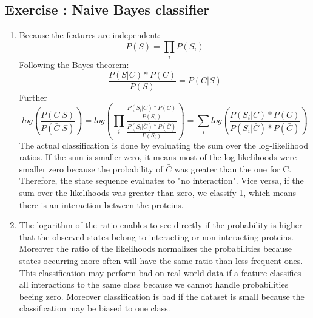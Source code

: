 \documentclass[10pt,a4paper]{article}
\newcommand{\exercise}[1]
{
  \stepcounter{subsection}
  \subsection*{Exercise \thesubsection: #1}

}
\begin{document}
\exercise{Naive Bayes classifier}
\begin{enumerate}
\item Because the features are independent: \begin{equation}P(S) = \prod_{i} P(S_i) \end{equation}
Following the Bayes theorem: \begin{equation} \frac{P(S|C) * P(C)} {P(S)} = P(C|S) \end{equation}
Further \begin{equation} log( \frac{P(C|S)} {P(\bar{C}|S)} ) = log( \prod_{i} \frac{ \frac{P(S_i|C) * P(C)}{P(S_i)} }{ \frac{P(S_i|\bar{C}) * P(\bar{C})}{P(S_i)} } ) = \sum_{i} log( \frac{P(S_i|C) * P(C)}{P(S_i|\bar{C}) * P(\bar{C})} ) \end{equation}
The actual classification is done by evaluating the sum over the log-likelihood ratios. If the sum is smaller zero, it means most of the log-likelihoods were smaller zero because the probability of $\bar{C}$ was greater than the one for C. Therefore, the state sequence evaluates to "no interaction". Vice versa, if the sum over the likelihoods was greater than zero, we classify 1, which means there is an interaction between the proteins.

\item The logarithm of the ratio enables to see directly if the probability is higher that the observed states belong to interacting or non-interacting proteins.
Moreover the ratio of the likelihoods normalizes the probabilities because states occurring more often will have the same ratio than less frequent ones.\\
This classification may perform bad on real-world data if a feature classifies all interactions to the same class because we cannot handle probabilities beeing zero. Moreover classification is bad if the dataset is small because the classification may be biased to one class.


\end{enumerate}
\end{document}

